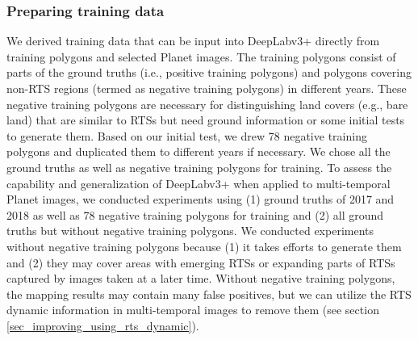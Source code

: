 \documentclass[authoryear,preprint,review,12pt]{elsarticle}
\begin{document}

\subsubsection{Preparing training data}
\label{sec_prepare_training}



We derived training data that can be input into DeepLabv3+ directly from training polygons and selected Planet images.
The training polygons consist of parts of the ground truths (i.e., positive training polygons) and polygons covering non-RTS regions (termed as negative training polygons) in different years.
These negative training polygons are necessary for distinguishing land covers (e.g., bare land) that are similar to RTSs but need ground information or some initial tests to generate them. 
Based on our initial test, we drew 78 negative training polygons and duplicated them to different years if necessary. 
We chose all the ground truths as well as negative training polygons for training. 
To assess the capability and generalization of DeepLabv3+ when applied to multi-temporal Planet images, we conducted experiments using (1) ground truths of 2017 and 2018 as well as 78 negative training polygons for training and (2) all ground truths but without negative training polygons.
We conducted experiments without negative training polygons because (1) it takes efforts to generate them and (2) they may cover areas with emerging RTSs or expanding parts of RTSs captured by images taken at a later time. 
Without negative training polygons, the mapping results may contain many false positives, but we can utilize the RTS dynamic information in multi-temporal images to remove them (see section \ref{sec_improving_using_rts_dynamic}).
\end{document}
